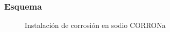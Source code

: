 \documentclass{article}
\begin{document}
\subsubsection*{Esquema}
\begin{figure}[H]
\begin{center}
\end{center}
\caption{Instalación de corrosión en sodio CORRONa}
\end{figure}
\end{document}
